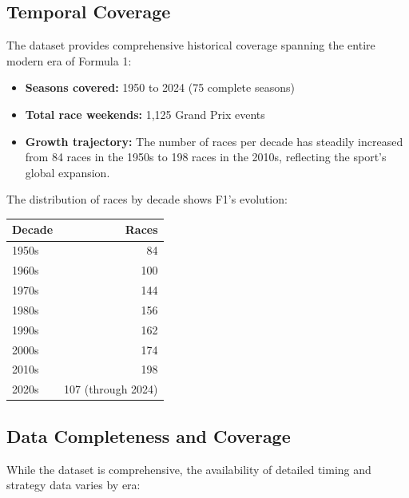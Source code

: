 \documentclass[11pt]{article}
\begin{document}
\subsection{Temporal Coverage}

The dataset provides comprehensive historical coverage spanning the entire modern era of Formula 1:

\begin{itemize}[leftmargin=1.5em]
    \item \textbf{Seasons covered:} 1950 to 2024 (75 complete seasons)
    \item \textbf{Total race weekends:} 1,125 Grand Prix events
    \item \textbf{Growth trajectory:} The number of races per decade has steadily increased from 84 races in the 1950s to 198 races in the 2010s, reflecting the sport's global expansion.
\end{itemize}

The distribution of races by decade shows F1's evolution:

\begin{center}
\begin{tabular}{lr}
\hline
\textbf{Decade} & \textbf{Races} \\
\hline
1950s & 84 \\
1960s & 100 \\
1970s & 144 \\
1980s & 156 \\
1990s & 162 \\
2000s & 174 \\
2010s & 198 \\
2020s & 107 (through 2024) \\
\hline
\end{tabular}
\end{center}

\subsection{Data Completeness and Coverage}

While the dataset is comprehensive, the availability of detailed timing and strategy data varies by era:
\end{document}
